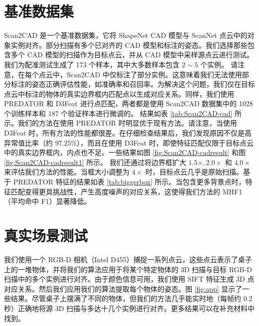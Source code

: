 \section{基准数据集}
Scan2CAD\cite{Scan2cad} 是一个基准数据集，它将 ShapeNet\cite{ShapeNet} CAD 模型与 ScanNet\cite{ScanNet} 点云中的对象实例对齐。部分扫描有多个已对齐的 CAD 模型和标注的姿态。我们选择那些包含多个 CAD 模型的扫描作为目标点云，并从 CAD 模型中采样源点云进行测试。我们为配准测试生成了 173 个样本，其中大多数样本包含 $2 \sim 5$ 个实例。
请注意，在每个点云中，Scan2CAD 中仅标注了部分实例。这意味着我们无法使用部分标注的姿态正确评估性能，如准确率和召回率。为解决这个问题，我们仅在目标点云中标注的物体的真实边界框内匹配点以生成对应关系。同样，我们使用 PREDATOR\cite{PREDATOR} 和 D3Feat\cite{D3Feat} 进行点匹配，两者都是使用 Scan2CAD 数据集中的 1028 个训练样本和 187 个验证样本进行微调的。
结果如表 \ref{tab:Scan2CAD-cad} 所示。我们的方法在使用 PREDATOR 时明显优于现有方法。请注意，当使用 D3Feat 时，所有方法的性能都很差。在仔细检查结果后，我们发现原因不仅是高异常值比率（约 $97.25\%$），而且在使用 D3Feat 时，即使特征匹配仅限于目标点云中的真实边界框内，内点也不足。一些结果如图 \ref{fig:Scan2CAD-cadresult} 和图 \ref{fig:Scan2CAD-cadresult1} 所示。
我们还通过将边界框扩大 $1.5\times, 2.0\times$ 和 $4.0\times$ 来评估我们方法的性能。当框大小调整为 $4\times$ 时，目标点云几乎是原始扫描。基于 PREDATOR 特征的结果如表 \ref{tab:biggerbox} 所示。当包含更多背景点时，特征匹配变得更具挑战性，产生高度噪声的对应关系，这使得我们方法的 MHF1（平均命中 F1）显著降低。
  
\section{真实场景测试}
我们使用一个 RGB-D 相机（Intel D455）捕捉一系列点云，这些点云表示了桌子上的一堆物体，并将我们的算法应用于将某个特定物体的 3D 扫描与目标 RGB-D 扫描中的多个实例进行对齐。由于颜色信息可用，我们使用 SIFT 特征生成 3D 点对应关系。然后我们应用我们的算法提取每个物体的姿态。图 \ref{fig:app} 显示了一些结果。尽管桌子上摆满了不同的物体，但我们的方法几乎能实时地（每帧约 $0.2$ 秒）正确地将源 3D 扫描与多达十几个实例进行对齐。更多结果可以在补充材料中找到。

